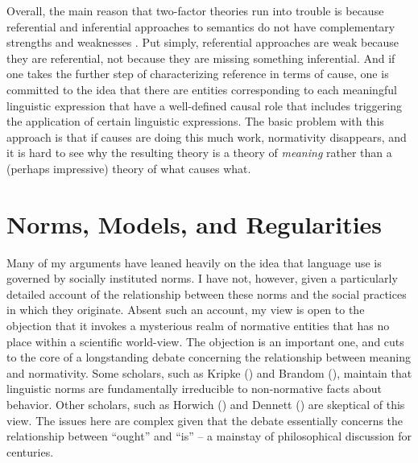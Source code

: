 Overall, the main reason that two-factor theories run into trouble is because referential and inferential approaches to semantics do not have complementary strengths and weaknesses \citep[c.f.,][]{Eliasmith:2000}. Put simply, referential approaches are weak because they are referential, not because they are missing something inferential. And if one takes the further step of characterizing reference in terms of cause, one is committed to the idea that there are entities corresponding to each meaningful linguistic expression that have a well-defined causal role that includes triggering the application of certain linguistic expressions. The basic problem with this approach is that if causes are doing this much work, normativity disappears, and it is hard to see why the resulting theory is a theory of \textit{meaning} rather than a (perhaps impressive) theory of what causes what.

\section{Norms, Models, and Regularities}

Many of my arguments have leaned heavily on the idea that language use is governed by socially instituted norms. I have not, however, given a particularly detailed account of the relationship between these norms and the social practices in which they originate. Absent such an account, my view is open to the objection that it invokes a mysterious realm of normative entities that has no place within a scientific world-view. The objection is an important one, and cuts to the core of a longstanding debate concerning the relationship between meaning and normativity. Some scholars, such as Kripke (\citeyear{Kripke:1982}) and Brandom (\citeyear{Brandom:1994}), maintain that linguistic norms are fundamentally irreducible to non-normative facts about behavior. Other scholars, such as Horwich (\citeyear{Horwich:2005}) and Dennett (\citeyear{Dennett:2010,Dennett:1987}) are skeptical of this view. The issues here are complex given that the debate essentially concerns the relationship between ``ought'' and ``is'' -- a mainstay of philosophical discussion for centuries. 

